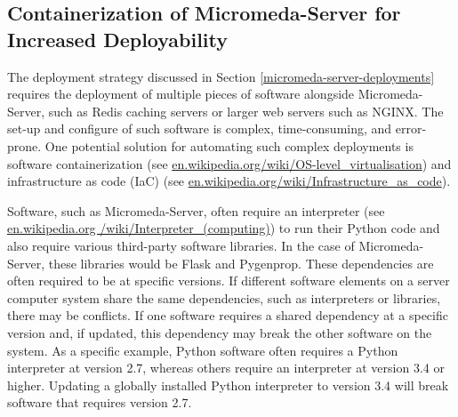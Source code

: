 \subsection{Containerization of Micromeda-Server for Increased Deployability}

The deployment strategy discussed in Section \ref{micromeda-server-deployments} requires the deployment of multiple pieces of software alongside Micromeda-Server, such as Redis caching servers or larger web servers such as NGINX. The set-up and configure of such software is complex, time-consuming, and error-prone. One potential solution for automating such complex deployments is software containerization \cite{syed2015software} (see \href{en.wikipedia.org/wiki/OS-level\_virtualisation}{en.wikipedia.org/wiki/OS-level\_virtualisation}) and infrastructure as code (IaC) \cite{artac2017devops} (see \href{en.wikipedia.org/wiki/Infrastructure\_as\_code}{en.wikipedia.org/wiki/Infrastructure\_as\_code}). 

Software, such as Micromeda-Server, often require an interpreter \cite{bennett1952interpretative} (see \href{en.wikipedia.org/wiki/Interpreter\_(computing)}{en.wikipedia.org /wiki/Interpreter\_(computing)}) to run their Python code and also require various third-party software libraries. In the case of Micromeda-Server, these libraries would be Flask and Pygenprop. These dependencies are often required to be at specific versions. If different software elements on a server computer system share the same dependencies, such as interpreters or libraries, there may be conflicts. If one software requires a shared dependency at a specific version and, if updated, this dependency may break the other software on the system. As a specific example, Python software often requires a Python interpreter at version 2.7, whereas others require an interpreter at version 3.4 or higher. Updating a globally installed Python interpreter to version 3.4 will break software that requires version 2.7. 

